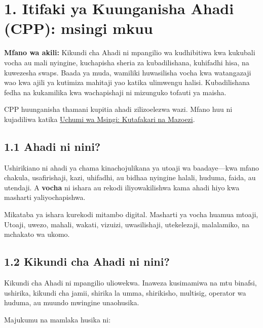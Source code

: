 \documentclass[11pt]{article}
\begin{document}
\section*{1. Itifaki ya Kuunganisha Ahadi (CPP): msingi mkuu}

\textbf{Mfano wa akili:} Kikundi cha Ahadi ni mpangilio wa kudhibitiwa kwa kukubali vocha au mali nyingine, kuchapisha sheria za kubadilishana, kuhifadhi hisa, na kuwezesha swaps. Baada ya muda, wamiliki huwasilisha vocha kwa watangazaji wao kwa ajili ya kutimiza mahitaji yao katika ulimwengu halisi. Kubadilishana fedha na kukamilika kwa wachapishaji ni mizunguko tofauti ya maisha.

CPP huunganisha thamani kupitia ahadi zilizoelezwa wazi. Mfano huu ni kujadiliwa katika \href{https://willruddick.substack.com/p/grassroots-economics-the-book-is}{Uchumi wa Msingi: Kutafakari na Mazoezi}.

\subsection*{1.1 Ahadi ni nini?}

Ushirikiano ni ahadi ya chama kinachojulikana ya utoaji wa baadaye---kwa mfano chakula, usafirishaji, kazi, uhifadhi, au bidhaa nyingine halali, huduma, faida, au utendaji. A \textbf{vocha} ni ishara au rekodi iliyowakilishwa kama ahadi hiyo kwa masharti yaliyochapishwa.

Mikataba ya ishara kurekodi mitambo digital. Masharti ya vocha huamua mtoaji, Utoaji, uwezo, mahali, wakati, vizuizi, uwasilishaji, utekelezaji, malalamiko, na mchakato wa ukomo.

\subsection*{1.2 Kikundi cha Ahadi ni nini?}

Kikundi cha Ahadi ni mpangilio uliowekwa. Inaweza kusimamiwa na mtu binafsi, ushirika, kikundi cha jamii, shirika la umma, shirikisho, multisig, operator wa huduma, au muundo mwingine unaohusika.

Majukumu na mamlaka husika ni:
\end{document}
